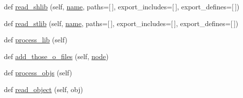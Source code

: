 \begin{DoxyCompactItemize}
def \hyperlink{namespacewaflib_1_1_tools_1_1ccroot_aa6ffb8f918a879780fccf80b04b4e2da}{read\+\_\+shlib} (self, \hyperlink{lib_2expat_8h_a1b49b495b59f9e73205b69ad1a2965b0}{name}, paths=\mbox{[}$\,$\mbox{]}, export\+\_\+includes=\mbox{[}$\,$\mbox{]}, export\+\_\+defines=\mbox{[}$\,$\mbox{]})
\item 
def \hyperlink{namespacewaflib_1_1_tools_1_1ccroot_a63bb0dcff2ba4649fe2a1c5b38bace1e}{read\+\_\+stlib} (self, \hyperlink{lib_2expat_8h_a1b49b495b59f9e73205b69ad1a2965b0}{name}, paths=\mbox{[}$\,$\mbox{]}, export\+\_\+includes=\mbox{[}$\,$\mbox{]}, export\+\_\+defines=\mbox{[}$\,$\mbox{]})
\item 
def \hyperlink{namespacewaflib_1_1_tools_1_1ccroot_a0c7dd6dd8e041dce2cadf0354606dfb1}{process\+\_\+lib} (self)
\item 
def \hyperlink{namespacewaflib_1_1_tools_1_1ccroot_ac7ed38877e335b491b2b8cee2868b0b9}{add\+\_\+those\+\_\+o\+\_\+files} (self, \hyperlink{structnode}{node})
\item 
def \hyperlink{namespacewaflib_1_1_tools_1_1ccroot_ab1fb77c5a01dd5e4c58184caaf80fcad}{process\+\_\+objs} (self)
\item 
def \hyperlink{namespacewaflib_1_1_tools_1_1ccroot_a6c9f92ebe00583811ae1e0f9e5040457}{read\+\_\+object} (self, obj)
\end{DoxyCompactItemize}
